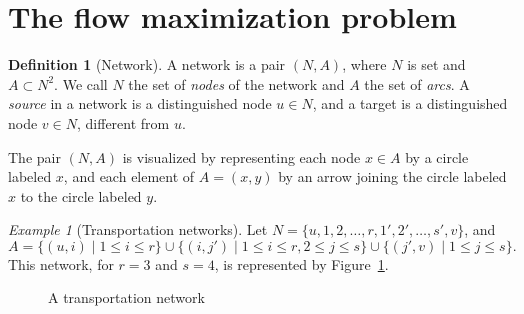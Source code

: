 \documentclass{amsbook}
\theoremstyle{definition}
\newtheorem{definition}[theorem]{Definition}
\theoremstyle{remark}
\newtheorem{example}[theorem]{Example}
\begin{document}
\section{The flow maximization problem}
\label{sec:flow-optim-probl}
\begin{definition}[Network]
  A network is a pair $(N,A)$, where $N$ is set and $A\subset N^2$.
  We call $N$ the set of \emph{nodes} of the network and $A$ the set of \emph{arcs}.
  A \emph{source} in a network is a distinguished node $u\in N$, and a target is a distinguished node $v\in N$, different from $u$.
\end{definition}
The pair $(N,A)$ is visualized by representing each node $x\in A$ by a circle labeled $x$, and each element of $A=(x,y)$ by an arrow joining the circle labeled $x$ to the circle labeled $y$.
\begin{example}[Transportation networks]
  \label{example:transportation-network}
  Let $N=\{u,1,2,\dotsc,r,1',2',\dotsc,s',v\}$, and
  \begin{displaymath}
    A = \{(u,i)\mid 1\leq i\leq r\}\cup\{(i,j')\mid 1\leq i\leq r,2\leq j\leq s\}\cup\{(j',v)\mid 1\leq j\leq s\}.
  \end{displaymath}
  This network, for $r=3$ and $s=4$, is represented by Figure~\ref{fig:transport}.
  \begin{figure}
    \begin{center}
    \end{center}
    \caption{A transportation network}
    \label{fig:transport}
  \end{figure}
\end{example}
\end{document}
